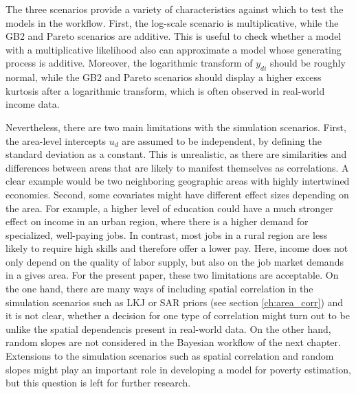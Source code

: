 The three scenarios provide a variety of characteristics against which to test the models in the workflow.
First, the log-scale scenario is multiplicative, while the GB2 and Pareto scenarios are additive.
This is useful to check whether a model with a multiplicative likelihood also can approximate a model whose generating process is additive.
Moreover, the logarithmic transform of $y_{di}$ should be roughly normal, while the GB2 and Pareto scenarios should display a higher excess kurtosis after a logarithmic transform, which is often observed in real-world income data.

Nevertheless, there are two main limitations with the simulation scenarios.
First, the area-level intercepts $u_d$ are assumed to be independent, by defining the standard deviation as a constant.
This is unrealistic, as there are similarities and differences between areas that are likely to manifest themselves as correlations.
A clear example would be two neighboring geographic areas with highly intertwined economies.
Second, some covariates might have different effect sizes depending on the area.
For example, a higher level of education could have a much stronger effect on income in an urban region, where there is a higher demand for specialized, well-paying jobs.
In contrast, most jobs in a rural region are less likely to require high skills and therefore offer a lower pay.
Here, income does not only depend on the quality of labor supply, but also on the job market demands in a gives area.
For the present paper, these two limitations are acceptable.
On the one hand, there are many ways of including spatial correlation in the simulation scenarios such as LKJ or SAR priors (see section \ref{ch:area_corr}) and it is not clear, whether a decision for one type of correlation might turn out to be unlike the spatial dependencis present in real-world data.
On the other hand, random slopes are not considered in the Bayesian workflow of the next chapter.
Extensions to the simulation scenarios such as spatial correlation and random slopes might play an important role in developing a model for poverty estimation, but this question is left for further research.